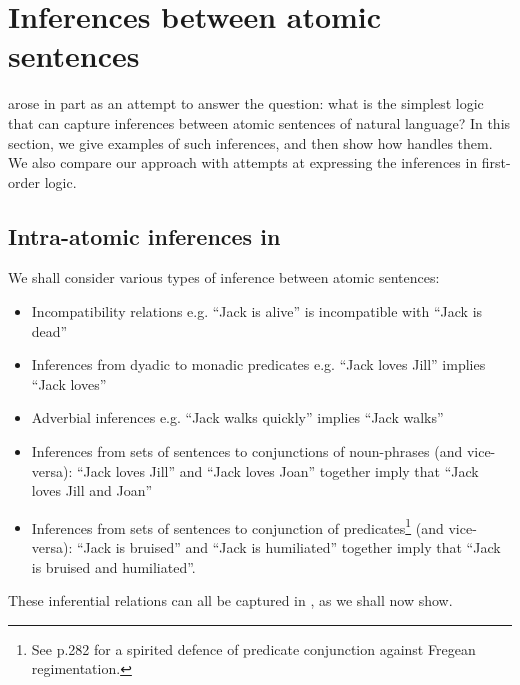 
\section{Inferences between atomic sentences}\label{naturalLanguageInference}

\NI \Cathoristic{} arose in part as an attempt to answer the
question: what is the simplest logic that can capture inferences
between atomic sentences of natural language?  In this section, we
give examples of such inferences, and then show how \cathoristic{}
handles them.  We also compare our approach with attempts at
expressing the inferences in first-order logic.

\subsection{Intra-atomic inferences in \cathoristic{}}

We shall consider various types of inference between atomic sentences:
\begin{itemize}
\item
Incompatibility relations e.g. ``Jack is alive'' is incompatible with ``Jack is dead''
\item
Inferences from dyadic to monadic predicates e.g. ``Jack loves Jill'' implies ``Jack loves''
\item
Adverbial inferences e.g. ``Jack walks quickly'' implies ``Jack walks''
\item
Inferences from sets of sentences to conjunctions of noun-phrases (and vice-versa):
``Jack loves Jill'' and ``Jack loves Joan'' together imply that ``Jack loves Jill and Joan''
\item
Inferences from sets of sentences to conjunction of
predicates\footnote{See \cite{sommers} p.282 for a spirited defence of
  predicate conjunction against Fregean regimentation.} (and
vice-versa):
``Jack is bruised'' and ``Jack is humiliated'' together imply that ``Jack is bruised and humiliated''.
\end{itemize}

\NI These inferential relations can all be captured in \cathoristic{}, as we
shall now show.

